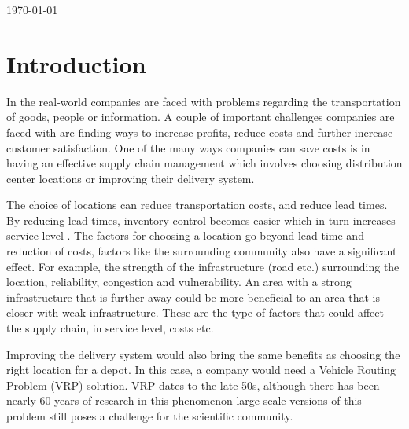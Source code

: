 \documentclass[a4paper,11pt]{article}
\begin{document}
\begin{titlepage}
{\large \today}\\[3cm] %


 

\vfill %

\end{titlepage}

\section{Introduction}
In the real-world companies are faced with problems regarding the transportation of goods, people or information. A couple of important challenges companies are faced with are finding ways to increase profits, reduce costs and further increase customer satisfaction. One of the many ways companies can save costs is in having an effective supply chain management which involves choosing distribution center locations or improving their delivery system. 

The choice of locations can reduce transportation costs, and reduce lead times. By reducing lead times, inventory control becomes easier which in turn increases service level \cite{gallmann2011linking}. The factors for choosing a location go beyond lead time and reduction of costs, factors like the surrounding community also have a significant effect. For example, the strength of the infrastructure (road etc.) surrounding the location, reliability, congestion and vulnerability. An area with a strong infrastructure that is further away could be more beneficial to an area that is closer with weak infrastructure. These are the type of factors that could affect the supply chain, in service level, costs etc. 

Improving the delivery system would also bring the same benefits as choosing the right location for a depot. In this case, a company would need a Vehicle Routing Problem (VRP) solution. VRP dates to the late 50s, although there has been nearly 60 years of research in this phenomenon large-scale versions of this problem still poses a challenge for the scientific community. 
\end{document}
